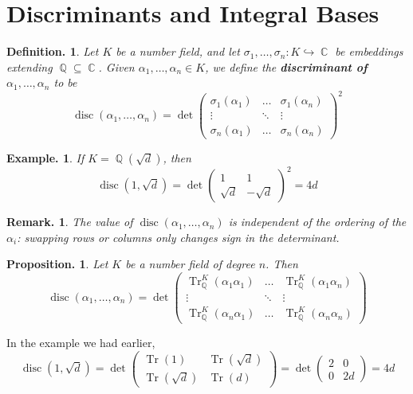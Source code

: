 \documentclass[11pt, a4paper]{memoir}
\DeclareMathOperator{\Q}{{\mathbb{Q}}}
\DeclareMathOperator{\C}{{\mathbb{C}}}
\theoremstyle{change}
\newtheorem{proposition}[theorem]{Proposition.}
\theoremstyle{plain}
\theoremstyle{nonumberplain}
\newtheorem{definition}{Definition.}
\newtheorem{example}{Example.}
\newtheorem{remark}{Remark.}
\DeclareMathOperator{\disc}{disc}
\DeclareMathOperator{\Tr}{Tr}
\begin{document}
\section{Discriminants and Integral Bases}
\begin{definition}
    Let $K$ be a number field, and let $\sigma_1,\ldots,\sigma_n:K\hookrightarrow\C$ be embeddings extending $\Q\subseteq\C$.
    Given $\alpha_1,\ldots,\alpha_n\in K$, we define the \textbf{discriminant of $\alpha_1,\ldots,\alpha_n$} to be
    \begin{equation*}
        \disc(\alpha_1,\ldots,\alpha_n)=\det
        \begin{pmatrix}
            \sigma_1(\alpha_1) & \hdots & \sigma_1(\alpha_n)\\
            \vdots &\ddots&\vdots\\
            \sigma_n(\alpha_1) & \hdots & \sigma_n(\alpha_n)
        \end{pmatrix}^2
    \end{equation*}
\end{definition}
\begin{example}
    If $K=\Q(\sqrt{d})$, then
    \begin{equation*}\disc(1,\sqrt{d})=\det\begin{pmatrix}1&1\\\sqrt{d}&-\sqrt{d}\end{pmatrix}^2=4d\end{equation*}
\end{example}
\begin{remark}
    The value of $\disc(\alpha_1,\ldots,\alpha_n)$ is independent of the ordering of the $\alpha_i$: swapping rows or columns only changes sign in the determinant.
\end{remark}
\begin{proposition}
    Let $K$ be a number field of degree $n$.
    Then
    \begin{equation*}
        \disc(\alpha_1,\ldots,\alpha_n)=\det
        \begin{pmatrix}
            \Tr_{\Q}^K(\alpha_1\alpha_1)&\hdots&\Tr_{\Q}^K(\alpha_1\alpha_n)\\
            \vdots&\ddots&\vdots\\
            \Tr_{\Q}^K(\alpha_n\alpha_1)&\hdots&\Tr_{\Q}^K(\alpha_n\alpha_n)
        \end{pmatrix}
    \end{equation*}
\end{proposition}
In the example we had earlier,
\begin{equation*}
    \disc(1,\sqrt{d})=\det\begin{pmatrix}\Tr(1)&\Tr(\sqrt{d})\\\Tr(\sqrt{d})&\Tr(d)\end{pmatrix}=\det\begin{pmatrix}2&0\\0&2d\end{pmatrix}=4d
\end{equation*}
\end{document}
